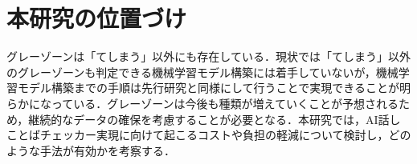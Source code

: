 \section{本研究の位置づけ}
グレーゾーンは「てしまう」以外にも存在している．現状では「てしまう」以外のグレーゾーンも判定できる機械学習モデル構築には着手していないが，機械学習モデル構築までの手順は先行研究と同様にして行うことで実現できることが明らかになっている．グレーゾーンは今後も種類が増えていくことが予想されるため，継続的なデータの確保を考慮することが必要となる．本研究では，AI話しことばチェッカー実現に向けて起こるコストや負担の軽減について検討し，どのような手法が有効かを考察する．
